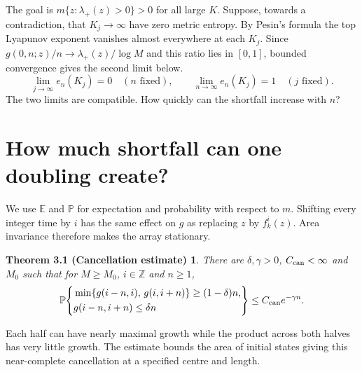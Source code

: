 \documentclass[11pt,a4paper]{article}
\newcommand{\Z}{\mathbb{Z}}
\newcommand{\PP}{\mathbb{P}}
\newcommand{\EE}{\mathbb{E}}
\newtheorem*{cancellation}{Theorem 3.1 (Cancellation estimate)}
\begin{document}
The goal is $m\{z:\lambda_+(z)>0\}>0$ for all large $K$. Suppose, towards a
contradiction, that $K_j\to\infty$ have zero metric entropy. By Pesin's formula
the top Lyapunov exponent vanishes almost everywhere at each $K_j$. Since
$g(0,n;z)/n\to\lambda_+(z)/\log M$ and this ratio lies in $[0,1]$, bounded
convergence gives the second limit below.
\[
 \boxed{\quad \lim_{j\to\infty}e_n(K_j)=0\quad(n\text{ fixed}),\qquad
             \lim_{n\to\infty}e_n(K_j)=1\quad(j\text{ fixed}).\quad}
\]
The two limits are compatible. How quickly can the shortfall increase with $n$?

\newpage
\section{How much shortfall can one doubling create?}
We use $\EE$ and $\PP$ for expectation and probability with respect to $m$.
Shifting every integer time by $i$ has the same effect on $g$ as replacing $z$
by $f_k^i(z)$. Area invariance therefore makes the array stationary.

\begin{cancellation}
There are $\delta,\gamma>0$, $C_{\rm can}<\infty$ and $M_0$ such that for
$M\ge M_0$, $i\in\Z$ and $n\ge1$,
\[
 \PP\!\left\{\begin{aligned}
 &\min\{g(i-n,i),\,g(i,i+n)\}\ge(1-\delta)n,\\
 &g(i-n,i+n)\le\delta n
 \end{aligned}\right\}\le C_{\rm can}e^{-\gamma n}.
\]
\end{cancellation}
Each half can have nearly maximal growth while the product across both halves
has very little growth. The estimate bounds the area of initial states giving
this near-complete cancellation at a specified centre and length.
\end{document}
